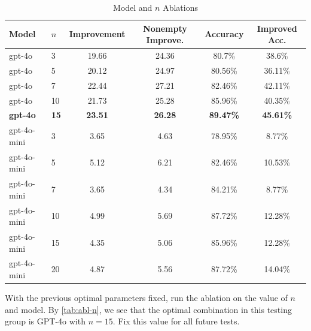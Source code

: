 \begin{table}[h]
\caption{Model and $n$ Ablations}
\label{tab:abl-n}
\centering
\small
\begin{tabular}{ll|cccc}
\toprule
Model & $n$ & Improvement& Nonempty Improve.& Accuracy & Improved Acc.\\
\midrule
gpt-4o & 3 &  19.66 & 24.36 & 80.7\% & 38.6\% \\
gpt-4o & 5 &  20.12 & 24.97 & 80.56\% & 36.11\% \\
gpt-4o & 7 &  22.44 & 27.21 & 82.46\% & 42.11\% \\
gpt-4o & 10 &  21.73 & 25.28 & 85.96\% & 40.35\% \\
\textbf{gpt-4o} & \textbf{15} &  \textbf{23.51} & \textbf{26.28} & \textbf{89.47\%} & \textbf{45.61\%} \\
gpt-4o-mini & 3 &  3.65 & 4.63 & 78.95\% & 8.77\% \\
gpt-4o-mini & 5 &  5.12 & 6.21 & 82.46\% & 10.53\% \\
gpt-4o-mini & 7 &  3.65 & 4.34 & 84.21\% & 8.77\% \\
gpt-4o-mini & 10 &  4.99 & 5.69 & 87.72\% & 12.28\% \\
gpt-4o-mini & 15 &  4.35 & 5.06 & 85.96\% & 12.28\% \\
gpt-4o-mini & 20 &  4.87 & 5.56 & 87.72\% & 14.04\% \\
\bottomrule
\end{tabular}
\end{table}


With the previous optimal parameters fixed, run the ablation on the value of $n$ and model. By \autoref{tab:abl-n}, we see that the optimal combination in this testing group is GPT-4o with $n=15$. Fix this value for all future tests.


